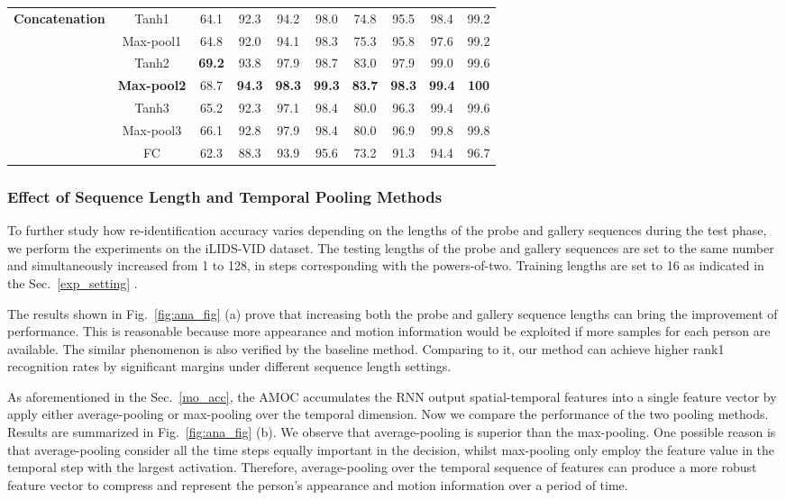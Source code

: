 \documentclass[journal]{IEEEtran}
\begin{document}
\begin{table*}[htbp]
\begin{tabular}{c|c|cccc|cccc}
		\hline
		\multirow{7}{*}{\textbf{Concatenation}} &{Tanh1} & 64.1 & 92.3 & 94.2 & 98.0 &74.8 & 95.5&98.4 &99.2\\
		&{Max-pool1} & 64.8 & 92.0 & 94.1 & 98.3 &75.3 & 95.8&97.6 &99.2\\
		&{Tanh2} & \textbf{69.2} & 93.8 & 97.9 & 98.7 &83.0 & 97.9&99.0 &99.6\\
		&\textbf{Max-pool2} & 68.7 & \textbf{94.3} & \textbf{98.3} & \textbf{99.3} & \textbf{83.7} & \textbf{98.3} & \textbf{99.4} & \textbf{100} \\
		&{Tanh3} & 65.2 & 92.3 & 97.1 & 98.4 &80.0 & 96.3&99.4 &99.6\\
		&{Max-pool3} & 66.1 & 92.8 & 97.9 & 98.4 &80.0 & 96.9&99.8 &99.8\\
		&{FC} & 62.3 & 88.3 & 93.9 & 95.6 &73.2 & 91.3&94.4 &96.7\\
		\hline
	\end{tabular}%
	
	\label{tab:fusion}%
\end{table*}%


\subsubsection{Effect of  Sequence Length and Temporal Pooling Methods}\label{lenandtp}
To further study how re-identification accuracy varies depending on the lengths of the probe and gallery sequences during the test phase, we perform the experiments on the iLIDS-VID dataset. The testing lengths of the probe and gallery sequences are set to the same number and  simultaneously increased from 1 to 128, in steps corresponding with the powers-of-two. Training lengths are set to 16 as indicated in the Sec.~\ref{exp_setting} .

The results shown in Fig.~\ref{fig:ana_fig} (a) prove that increasing both the probe and gallery sequence lengths can bring the improvement of performance. This is reasonable because more appearance and motion information would be exploited if more samples for each person are available. The similar phenomenon is also verified by the baseline method\cite{mclaughlinrecurrent}. Comparing to it, our method can achieve higher rank1 recognition rates by significant margins under different sequence length settings.

As aforementioned in the Sec.~\ref{mo_acc},  the AMOC accumulates the RNN output spatial-temporal features into a single feature vector by apply either average-pooling or max-pooling over the temporal dimension. Now we compare the performance of the two pooling methods. Results are summarized in 
Fig.~\ref{fig:ana_fig} (b). We observe that average-pooling is superior than the max-pooling. One possible reason is that average-pooling consider all the time steps equally important in the decision, whilst  max-pooling only employ the feature value in the temporal step with the largest activation. Therefore, average-pooling over the temporal sequence of features can produce a more robust feature vector to compress and represent the person's appearance and motion information over a period of time. 
\end{document}
